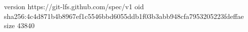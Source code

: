 version https://git-lfs.github.com/spec/v1
oid sha256:4c4d871b4b8967ef1c5546bbd6055ddb1f03b3abb948cfa7953205223fdeffae
size 43840
